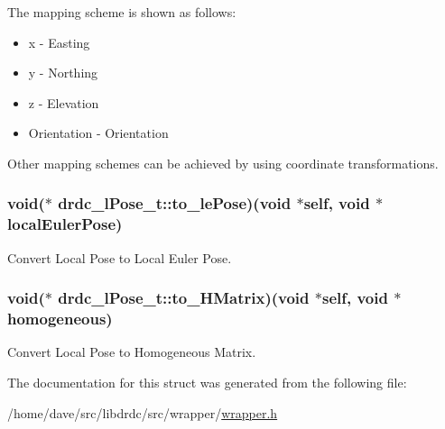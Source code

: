 The mapping scheme is shown as follows:\begin{itemize}
\item x - Easting\item y - Northing\item z - Elevation\item Orientation - Orientation\end{itemize}


Other mapping schemes can be achieved by using coordinate transformations. \hypertarget{structdrdc__lPose__t_78f7d7124384ad525040834608a80e7b}{
\subsubsection[to\_\-lePose]{\setlength{\rightskip}{0pt plus 5cm}void($\ast$ {\bf drdc\_\-lPose\_\-t::to\_\-lePose})(void $\ast$self, void $\ast$localEulerPose)}}
\label{structdrdc__lPose__t_78f7d7124384ad525040834608a80e7b}


Convert Local Pose to Local Euler Pose. 

\hypertarget{structdrdc__lPose__t_8edc1a2e055fc2c8d4bdd1fdc95ed531}{
\subsubsection[to\_\-HMatrix]{\setlength{\rightskip}{0pt plus 5cm}void($\ast$ {\bf drdc\_\-lPose\_\-t::to\_\-HMatrix})(void $\ast$self, void $\ast$homogeneous)}}
\label{structdrdc__lPose__t_8edc1a2e055fc2c8d4bdd1fdc95ed531}


Convert Local Pose to Homogeneous Matrix. 



The documentation for this struct was generated from the following file:\begin{CompactItemize}
\item 
/home/dave/src/libdrdc/src/wrapper/\hyperlink{wrapper_8h}{wrapper.h}\end{CompactItemize}

